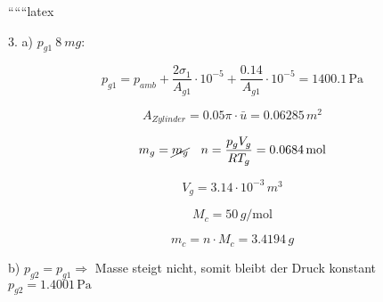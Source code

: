
``````latex


3. a) $p_{g1} \ 8 \ mg:$

\[
p_{g1} = p_{amb} + \frac{2 \sigma_1}{A_{g1}} \cdot 10^{-5} + \frac{0.14}{A_{g1}} \cdot 10^{-5} = 1400.1 \, \text{Pa}
\]

\[
A_{Zylinder} = 0.05 \pi \cdot \bar{u} = 0.06285 \, m^2
\]

\[
m_g = \cancel{m_g} \quad n = \frac{p_g V_g}{R T_g} = 0.0684 \, \text{mol}
\]

\[
V_g = 3.14 \cdot 10^{-3} \, m^3
\]

\[
M_c = 50 \, g/\text{mol}
\]

\[
m_c = n \cdot M_c = 3.4194 \, g
\]

b) $p_{g2} = p_{g1} \Rightarrow$ Masse steigt nicht, somit bleibt der Druck konstant $p_{g2} = 1.4001 \, \text{Pa}$

